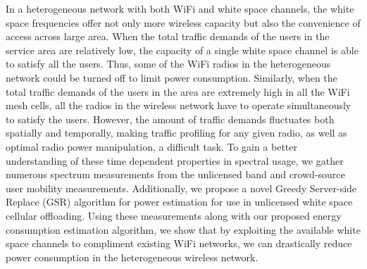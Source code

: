 In a heterogeneous network with both WiFi and white space channels, the white space frequencies offer not only more wireless capacity but also the convenience of access across large area. 
When the total traffic demands of the users in the service area are relatively low, the capacity of a single white space channel is able to satisfy all the users. 
Thus, some of the WiFi radios in the heterogeneous network could be turned off to limit power consumption. 
Similarly, when the total traffic demands of the users in the area are extremely high in all the WiFi mesh cells, all the radios in the wireless network have to operate simultaneously to satisfy the users.
However, the amount of traffic demands fluctuates both spatially and temporally, making traffic profiling for any given radio, as well as optimal radio power manipulation, a difficult task.
To gain a better understanding of these time dependent properties in spectral usage, we gather numerous spectrum measurements from the unlicensed band and crowd-source user mobility measurements. 
Additionally, we propose a novel Greedy Server-side Replace (GSR) algorithm for power estimation for use in unlicensed white space cellular offloading.
Using these measurements along with our proposed energy consumption estimation algorithm, we show that by exploiting the available white space channels to compliment existing WiFi networks, we can drastically reduce power consumption in the heterogeneous wireless network.


